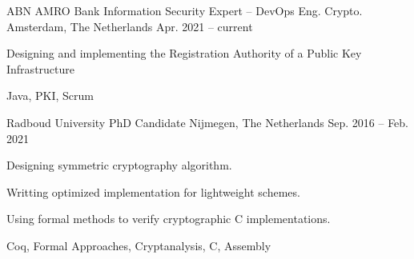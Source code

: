 

\begin{cventries}

	\cventrysix%
	{ABN AMRO Bank} %
	{Information Security Expert -- DevOps Eng. Crypto.} %
	{Amsterdam, The Netherlands} %
	{Apr. 2021 -- current} %
	{
		\begin{cvitems} %
			\item {Designing and implementing the Registration Authority of a Public Key Infrastructure} %
		\end{cvitems}
	}%
	{Java, PKI, Scrum}%


	\cventrysix%
	{Radboud University} %
	{PhD Candidate} %
	{Nijmegen, The Netherlands} %
	{Sep. 2016 -- Feb. 2021} %
	{
		\begin{cvitems} %
			\item {Designing symmetric cryptography algorithm.} %
			\item {Writting optimized implementation for lightweight schemes.} %
			\item {Using formal methods to verify cryptographic C implementations.} %
		\end{cvitems}
	}%
	{Coq, Formal Approaches, Cryptanalysis, C, Assembly}%



\end{cventries}

